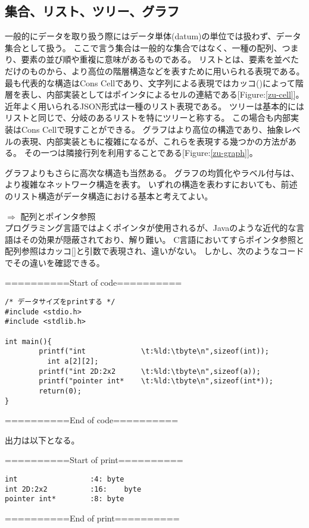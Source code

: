 \subsection{集合、リスト、ツリー、グラフ}


一般的にデータを取り扱う際にはデータ単体(datum)の単位では扱わず、データ集合として扱う。
ここで言う集合は一般的な集合ではなく、一種の配列、つまり、要素の並び順や重複に意味があるものである。
リストとは、要素を並べただけのものから、より高位の階層構造などを表すために用いられる表現である。
最も代表的な構造はCons Cellであり、文字列による表現ではカッコ()によって階層を表し、内部実装としてはポインタによるセルの連結である[Figure:\ref{zu-cell}]。
近年よく用いられるJSON形式は一種のリスト表現である。
ツリーは基本的にはリストと同じで、分岐のあるリストを特にツリーと称する。
この場合も内部実装はCons Cellで現すことができる。
グラフはより高位の構造であり、抽象レベルの表現、内部実装ともに複雑になるが、これらを表現する幾つかの方法がある。
その一つは隣接行列を利用することである[Figure:\ref{zu-graph}]。

グラフよりもさらに高次な構造も当然ある。
グラフの均質化やラベル付与は、より複雑なネットワーク構造を表す\cite{FujiwaraYuzuru}。
いずれの構造を表わすにおいても、前述のリスト構造がデータ構造における基本と考えてよい。

\begin{breakbox}
$\Rightarrow$ 配列とポインタ参照 \\
プログラミング言語ではよくポインタが使用されるが、Javaのような近代的な言語はその効果が隠蔽されており、解り難い。
C言語においてすらポインタ参照と配列参照はカッコ[]と引数で表現され、違いがない。
しかし、次のようなコードでその違いを確認できる。
\begin{center}
==========Start of code==========
\end{center}
\scriptsize
\begin{verbatim}
/* データサイズをprintする */
#include <stdio.h>
#include <stdlib.h>

int main(){
        printf("int             \t:%ld:\tbyte\n",sizeof(int));
          int a[2][2];
        printf("int 2D:2x2      \t:%ld:\tbyte\n",sizeof(a));
        printf("pointer int*    \t:%ld:\tbyte\n",sizeof(int*));
        return(0);
}
\end{verbatim}
\normalsize
\begin{center}
==========End of code==========
\end{center}
出力は以下となる。
\begin{center}
==========Start of print==========
\end{center}
\scriptsize
\begin{verbatim}
int             	:4:	byte
int 2D:2x2      	:16:	byte
pointer int*    	:8:	byte
\end{verbatim}
\normalsize
\begin{center}
==========End of print==========
\end{center}
\end{breakbox}

